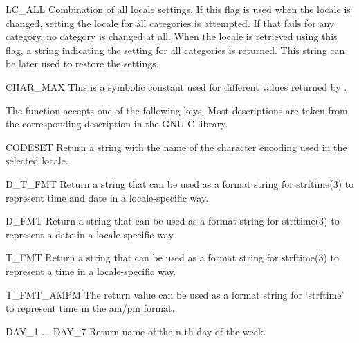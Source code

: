 \begin{datadesc}{LC_ALL}
  Combination of all locale settings.  If this flag is used when the
  locale is changed, setting the locale for all categories is
  attempted. If that fails for any category, no category is changed at
  all.  When the locale is retrieved using this flag, a string
  indicating the setting for all categories is returned. This string
  can be later used to restore the settings.
\end{datadesc}

\begin{datadesc}{CHAR_MAX}
  This is a symbolic constant used for different values returned by
  .
\end{datadesc}

The  function accepts one of the following keys.
Most descriptions are taken from the corresponding description in the
GNU C library.

\begin{datadesc}{CODESET}
Return a string with the name of the character encoding used in the
selected locale.
\end{datadesc}

\begin{datadesc}{D_T_FMT}
Return a string that can be used as a format string for strftime(3) to
represent time and date in a locale-specific way.
\end{datadesc}

\begin{datadesc}{D_FMT}
Return a string that can be used as a format string for strftime(3) to
represent a date in a locale-specific way.
\end{datadesc}

\begin{datadesc}{T_FMT}
Return a string that can be used as a format string for strftime(3) to
represent a time in a locale-specific way.
\end{datadesc}

\begin{datadesc}{T_FMT_AMPM}
The return value can be used as a format string for `strftime' to
represent time in the am/pm format.
\end{datadesc}

\begin{datadesc}{DAY_1 ... DAY_7}
Return name of the n-th day of the week. 
\end{datadesc}

